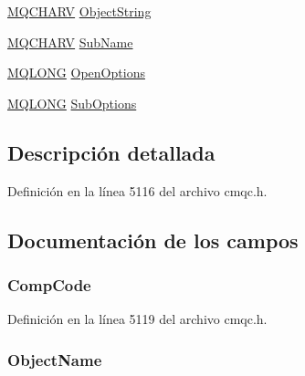\begin{DoxyCompactItemize}
\item 
\hyperlink{cmqc_8h_a2a61029e155515c1360dfc809dab6747}{M\+Q\+C\+H\+A\+R\+V} \hyperlink{structtag_m_q_s_t_s_a564791473371222ceb856cfaf02d6f91}{Object\+String}
\item 
\hyperlink{cmqc_8h_a2a61029e155515c1360dfc809dab6747}{M\+Q\+C\+H\+A\+R\+V} \hyperlink{structtag_m_q_s_t_s_a52ada97ac3869da3a2f04de08ed4c8d3}{Sub\+Name}
\item 
\hyperlink{cmqc_8h_a1fb8d28cbda3fa8766a9821230cdb6d5}{M\+Q\+L\+O\+N\+G} \hyperlink{structtag_m_q_s_t_s_aba7271572b7c49b5295b03e379f59686}{Open\+Options}
\item 
\hyperlink{cmqc_8h_a1fb8d28cbda3fa8766a9821230cdb6d5}{M\+Q\+L\+O\+N\+G} \hyperlink{structtag_m_q_s_t_s_a24b93fe1b9f7b2ddc533029552471ca4}{Sub\+Options}
\end{DoxyCompactItemize}


\subsection{Descripción detallada}


Definición en la línea 5116 del archivo cmqc.\+h.



\subsection{Documentación de los campos}
\hypertarget{structtag_m_q_s_t_s_a3d53860a50c3834d3dad9f5b2e5b5234}{}
\subsubsection[{Comp\+Code}]{ Comp\+Code}\label{structtag_m_q_s_t_s_a3d53860a50c3834d3dad9f5b2e5b5234}


Definición en la línea 5119 del archivo cmqc.\+h.

\hypertarget{structtag_m_q_s_t_s_a2106fb125a9f7fc606340ba23c006bc0}{}
\subsubsection[{Object\+Name}]{ Object\+Name}\label{structtag_m_q_s_t_s_a2106fb125a9f7fc606340ba23c006bc0}


